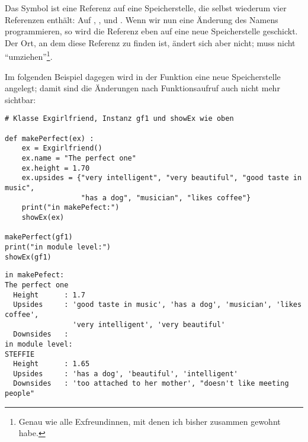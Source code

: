 {\begin{tcolorbox}[title=Speicherbild]
\begin{center}
\end{center}
\end{tcolorbox}
}

Das Symbol  ist eine Referenz auf eine Speicherstelle, die selbst wiederum vier Referenzen enthält: Auf , ,  und . Wenn wir nun eine Änderung des Namens programmieren, so wird die Referenz  eben auf eine neue Speicherstelle geschickt. Der Ort, an dem diese Referenz zu finden ist, ändert sich aber nicht;  muss nicht \enquote{umziehen}\footnote{Genau wie alle Exfreundinnen, mit denen ich bisher zusammen gewohnt habe.}.

Im folgenden Beispiel dagegen wird in der Funktion eine neue Speicherstelle angelegt; damit sind die Änderungen nach Funktionsaufruf auch nicht mehr sichtbar:
\begin{codebox}
\begin{verbatim}
# Klasse Exgirlfriend, Instanz gf1 und showEx wie oben

def makePerfect(ex) :
    ex = Exgirlfriend()
    ex.name = "The perfect one"
    ex.height = 1.70
    ex.upsides = {"very intelligent", "very beautiful", "good taste in music",
                  "has a dog", "musician", "likes coffee"}
    print("in makePefect:")
    showEx(ex)
    
makePerfect(gf1)
print("in module level:")
showEx(gf1)
\end{verbatim}
\end{codebox}
\begin{cmdbox}
\begin{verbatim}
in makePefect:
The perfect one
  Height      : 1.7
  Upsides     : 'good taste in music', 'has a dog', 'musician', 'likes coffee',
                'very intelligent', 'very beautiful'
  Downsides   : 
in module level:
STEFFIE
  Height      : 1.65
  Upsides     : 'has a dog', 'beautiful', 'intelligent'
  Downsides   : 'too attached to her mother', "doesn't like meeting people"
\end{verbatim}
\end{cmdbox}

